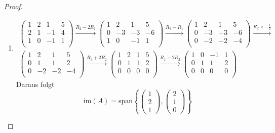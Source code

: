\documentclass[prb,12pt]{revtex4-2}
\theoremstyle{definition}
\theoremstyle{definition}
\newenvironment{parts}{\begin{enumerate}[label=(\alph*)]}{\end{enumerate}}
\begin{document}
\begin{proof}
	\begin{parts}
	\item 	\begin{align*}
		\left(
		\begin{array}{cccc}
			1 & 2 & 1 & 5 \\
			2 & 1 & -1 & 4 \\
			1 & 0 & -1 & 1 \\
		\end{array}
		\right) \xrightarrow{R_2-2R_1} \left(
		\begin{array}{cccc}
			1 & 2 & 1 & 5 \\
			0 & -3 & -3 & -6 \\
			1 & 0 & -1 & 1 \\
		\end{array}
		\right) \xrightarrow{R_3-R_1} \left(
		\begin{array}{cccc}
			1 & 2 & 1 & 5 \\
			0 & -3 & -3 & -6 \\
			0 & -2 & -2 & -4 \\
		\end{array}
		\right) \xrightarrow{R_2\times -\frac{1}{3}} \\\left(
		\begin{array}{cccc}
			1 & 2 & 1 & 5 \\
			0 & 1 & 1 & 2 \\
			0 & -2 & -2 & -4 \\
		\end{array}
		\right) \xrightarrow{R_3+2R_2} \left(
		\begin{array}{cccc}
			1 & 2 & 1 & 5 \\
			0 & 1 & 1 & 2 \\
			0 & 0 & 0 & 0 \\
		\end{array}
		\right) \xrightarrow{R_1-2R_2} \left(
		\begin{array}{cccc}
			1 & 0 & -1 & 1 \\
			0 & 1 & 1 & 2 \\
			0 & 0 & 0 & 0 \\
		\end{array}
		\right)
	\end{align*}
	Daraus folgt
	\[
	\text{im}(A)=\text{span}\left\{ \begin{pmatrix} 1 \\ 2 \\ 1 \end{pmatrix} , \begin{pmatrix} 2 \\ 1 \\ 0 \end{pmatrix}  \right\} 
\]
\end{parts}
\end{proof}
\end{document}
